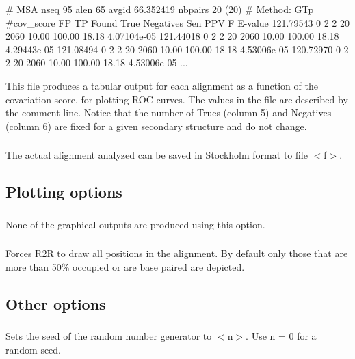 \begin{sreoutput}
# MSA nseq 95 alen 65 avgid 66.352419 nbpairs 20 (20)
# Method: GTp
#cov_score  FP  TP Found  True  Negatives  Sen   PPV     F       E-value
121.79543   0   2  2      20    2060       10.00 100.00  18.18   4.07104e-05
121.44018   0   2  2      20    2060       10.00 100.00  18.18   4.29443e-05
121.08494   0   2  2      20    2060       10.00 100.00  18.18   4.53006e-05
120.72970   0   2  2      20    2060       10.00 100.00  18.18   4.53006e-05
...
\end{sreoutput}

This file produces a tabular output for each alignment as a function
of the covariation score, for plotting ROC curves. The values in the
file are described by the comment line. Notice that the number of
Trues (column 5) and Negatives (column 6) are fixed for a given
secondary structure and do not change.

\subsubsection{} The actual alignment analyzed can be saved in Stockholm format to file $<$f$>$.


\subsection{Plotting options}

\subsubsection{} None of the graphical outputs are produced using this option.


\subsubsection{} Forces R2R to draw all positions in the alignment. By default only
those that are more than 50\% occupied or are base paired are
depicted.


\subsection{Other options}

\subsubsection{} Sets the seed of the random number generator to $<$n$>$. Use n = 0 for a random seed.










